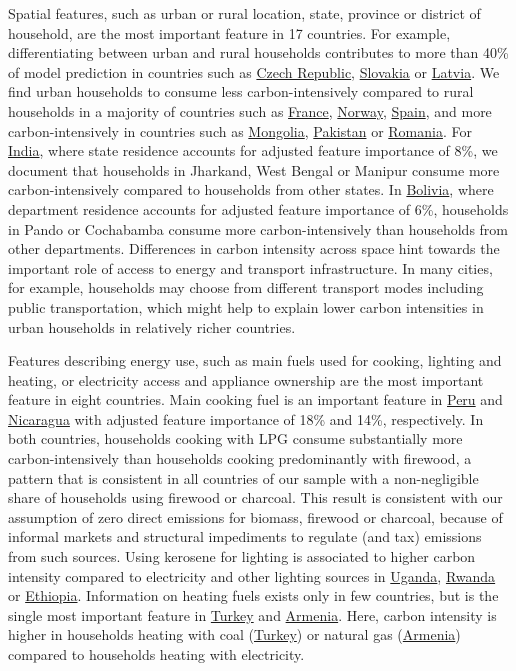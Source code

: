 \documentclass[12pt, a4paper]{article}
\begin{document}
Spatial features, such as urban or rural location, state, province or district of household, are the most important feature in 17 countries. For example, differentiating between urban and rural households contributes to more than 40\% of model prediction in countries such as \hyperref[fig:5b_CZE]{Czech Republic}, \hyperref[fig:5b_SVK]{Slovakia} or \hyperref[fig:5b_LVA]{Latvia}. We find urban households to consume less carbon-intensively compared to rural households in a majority of countries such as \hyperref[fig:5b_FRA]{France}, \hyperref[fig:5b_NOR]{Norway}, \hyperref[fig:5b_ESP]{Spain}, and more carbon-intensively in countries such as \hyperref[fig:5b_MNG]{Mongolia}, \hyperref[fig:5b_PAK]{Pakistan} or \hyperref[fig:5b_ROU]{Romania}. For \hyperref[fig:5b_IND]{India}, where state residence accounts for adjusted feature importance of 8\%, we document that households in Jharkand, West Bengal or Manipur consume more carbon-intensively compared to households from other states. In \hyperref[fig:5b_BOL]{Bolivia}, where department residence accounts for adjusted feature importance of 6\%, households in Pando or Cochabamba consume more carbon-intensively than households from other departments. Differences in carbon intensity across space hint towards the important role of access to energy and transport infrastructure. In many cities, for example, households may choose from different transport modes including public transportation, which might help to explain lower carbon intensities in urban households in relatively richer countries. 

Features describing energy use, such as main fuels used for cooking, lighting and heating, or electricity access and appliance ownership are the most important feature in eight countries. Main cooking fuel is an important feature in \hyperref[fig:5b_PER]{Peru} and \hyperref[fig:5b_NIC]{Nicaragua} with adjusted feature importance of 18\% and 14\%, respectively. In both countries, households cooking with LPG consume substantially more carbon-intensively than households cooking predominantly with firewood, a pattern that is consistent in all countries of our sample with a non-negligible share of households using firewood or charcoal. This result is consistent with our assumption of zero direct emissions for biomass, firewood or charcoal, because of informal markets and structural impediments to regulate (and tax) emissions from such sources. Using kerosene for lighting is associated to higher carbon intensity compared to electricity and other lighting sources in \hyperref[fig:5b_UGA]{Uganda}, \hyperref[fig:5b_RWA]{Rwanda} or \hyperref[fig:5b_ETH]{Ethiopia}. Information on heating fuels exists only in few countries, but is the single most important feature in \hyperref[fig:5b_TUR]{Turkey} and \hyperref[fig:5b_ARM]{Armenia}. Here, carbon intensity is higher in households heating with coal (\hyperref[fig:5b_TUR]{Turkey}) or natural gas (\hyperref[fig:5b_ARM]{Armenia}) compared to households heating with electricity.
\end{document}
